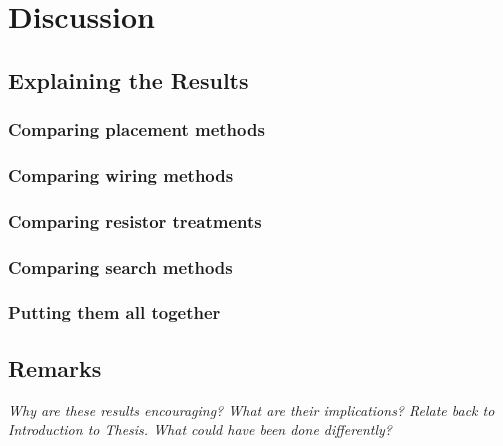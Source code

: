 
\chapter{Discussion}
\label{ch:discussion}

\section{Explaining the Results}

\subsection{Comparing placement methods}

\subsection{Comparing wiring methods}

\subsection{Comparing resistor treatments}

\subsection{Comparing search methods}

\subsection{Putting them all together}

\section{Remarks}

\textit{Why are these results encouraging? What are their implications? Relate
back to Introduction to Thesis. What could have been done differently?}
